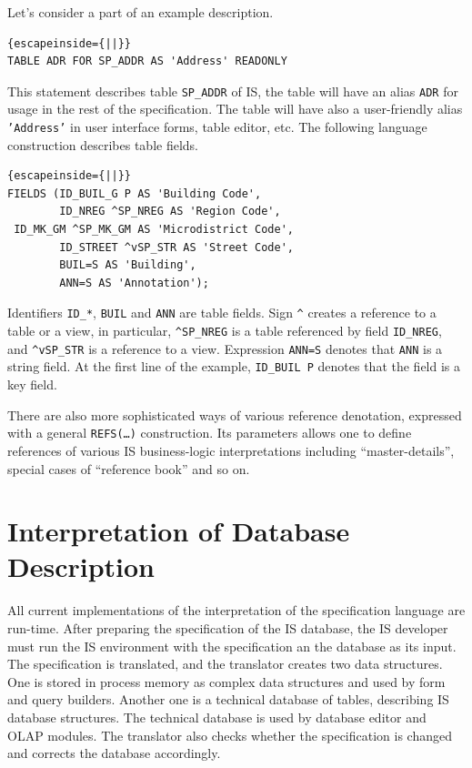\documentclass[conference]{IEEEtran}
\begin{document}
Let's consider a part of an example description.

\begin{lstlisting}{escapeinside={||}}
TABLE ADR FOR SP_ADDR AS 'Address' READONLY
\end{lstlisting}%

This statement describes table \texttt{SP\_ADDR} of IS, the table will have an alias \texttt{ADR} for usage in the rest of the specification.  The table will have also a user-friendly alias \texttt{'Address'} in user interface forms, table editor, etc.  The following language construction describes table fields.

\begin{lstlisting}{escapeinside={||}}
FIELDS (ID_BUIL_G P AS 'Building Code',
        ID_NREG ^SP_NREG AS 'Region Code',
 ID_MK_GM ^SP_MK_GM AS 'Microdistrict Code',
        ID_STREET ^vSP_STR AS 'Street Code',
        BUIL=S AS 'Building',
        ANN=S AS 'Annotation');
\end{lstlisting}%

Identifiers \texttt{ID\_*}, \texttt{BUIL} and \texttt{ANN} are table fields.  Sign \texttt{\^} creates a reference to a table or a view, in particular, \texttt{\^{}SP\_NREG} is a table referenced by field \texttt{ID\_NREG}, and \texttt{\^{}vSP\_STR} is a reference to a view.  Expression \texttt{ANN=S} denotes that \texttt{ANN} is a string field.  At the first line of the example, \texttt{ID\_BUIL P} denotes that the field is a key field.

There are also more sophisticated ways of various reference denotation, expressed with a general \texttt{REFS(\ldots)} construction.  Its parameters allows one to define references of various IS business-logic interpretations including ``master-details'', special cases of ``reference book'' and so on.

\section{Interpretation of Database Description}
\label{sec:interpr-descr}

All current implementations of the interpretation of the specification language are run-time.  After preparing the specification of the IS database, the IS developer must run the IS environment with the specification an the database as its input.  The specification is translated, and the translator creates two data structures.  One is stored in process memory as complex data structures and used by form and query builders.  Another one is a technical database of tables, describing IS database structures.  The technical database is used by database editor and OLAP modules.  The translator also checks whether the specification is changed and corrects the database accordingly.
\end{document}
